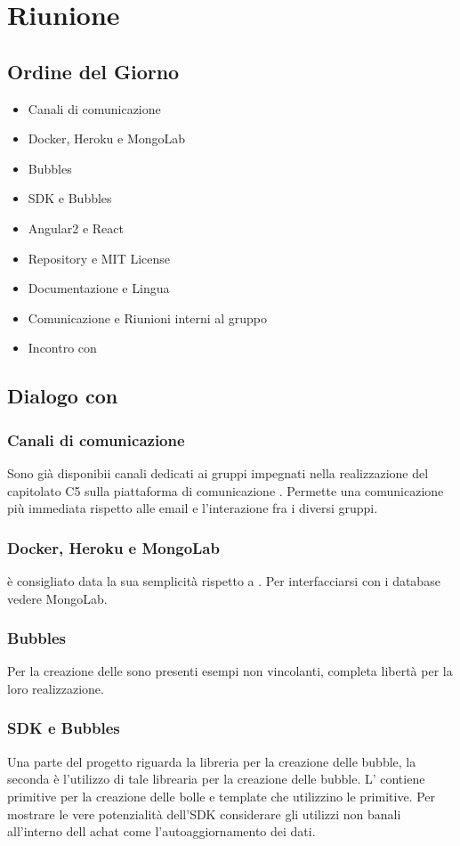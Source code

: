 \section{Riunione}
\subsection{Ordine del Giorno}
\begin{itemize}
	\item Canali di comunicazione
	\item Docker, Heroku e MongoLab
	\item Bubbles
	\item SDK e Bubbles
	\item Angular2 e React
	\item Repository e MIT License
	\item Documentazione e Lingua
	\item Comunicazione e Riunioni interni al gruppo \GroupName
	\item Incontro con \Proponente	
\end{itemize}

\subsection{Dialogo con \Proponente}
\subsubsection{Canali di comunicazione}
Sono già disponibii canali dedicati ai gruppi impegnati nella realizzazione del capitolato C5 sulla piattaforma di comunicazione . Permette una comunicazione più immediata rispetto alle email e l'interazione fra i diversi gruppi.

\subsubsection{Docker, Heroku e MongoLab}
 è consigliato data la sua semplicità rispetto a . 
Per interfacciarsi con i database vedere MongoLab.

\subsubsection{Bubbles}
Per la creazione delle  sono presenti esempi non vincolanti, completa libertà per la loro realizzazione.

\subsubsection{SDK e Bubbles}
Una parte del progetto riguarda la libreria per la creazione delle bubble, la seconda è l'utilizzo di tale librearia per la creazione delle bubble. L' contiene primitive per la creazione delle bolle e template che utilizzino le primitive.
Per mostrare le vere potenzialità dell'SDK considerare gli utilizzi non banali all'interno dell achat come l'autoaggiornamento dei dati.

